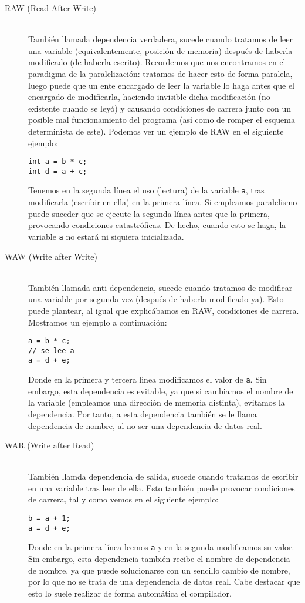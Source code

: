 \begin{description}
    \item [RAW (Read After Write)]~\\
        También llamada dependencia verdadera, sucede cuando tratamos de leer una variable (equivalentemente, posición de memoria) después de haberla modificado (de haberla escrito). Recordemos que nos encontramos en el paradigma de la paralelización: tratamos de hacer esto de forma paralela, luego puede que un ente encargado de leer la variable lo haga antes que el encargado de modificarla, haciendo invisible dicha modificación (no existente cuando se leyó) y causando condiciones de carrera junto con un posible mal funcionamiento del programa (así como de romper el esquema determinista de este). Podemos ver un ejemplo de RAW en el siguiente ejemplo:
    \begin{verbatim}
int a = b * c;
int d = a + c;
    \end{verbatim}
Tenemos en la segunda línea el uso (lectura) de la variable \verb|a|, tras modificarla (escribir en ella) en la primera línea. Si empleamos paralelismo puede suceder que se ejecute la segunda línea antes que la primera, provocando condiciones catastróficas. De hecho, cuando esto se haga, la variable \verb|a| no estará ni siquiera inicializada.

    \item [WAW (Write after Write)]~\\
        También llamada anti-dependencia, sucede cuando tratamos de modificar una variable por segunda vez (después de haberla modificado ya). Esto puede plantear, al igual que explicábamos en RAW, condiciones de carrera. Mostramos un ejemplo a continuación:
    \begin{verbatim}
a = b * c;
// se lee a
a = d + e;
    \end{verbatim}
Donde en la primera y tercera linea modificamos el valor de \verb|a|. Sin embargo, esta dependencia es evitable, ya que si cambiamos el nombre de la variable (empleamos una dirección de memoria distinta), evitamos la dependencia. Por tanto, a esta dependencia también se le llama dependencia de nombre, al no ser una dependencia de datos real.

    \item [WAR (Write after Read)]~\\
        También llamda dependencia de salida, sucede cuando tratamos de escribir en una variable tras leer de ella. Esto también puede provocar condiciones de carrera, tal y como vemos en el siguiente ejemplo:
    \begin{verbatim}
b = a + 1;
a = d + e;
    \end{verbatim}
Donde en la primera línea leemos \verb|a| y en la segunda modificamos su valor. Sin embargo, esta dependencia también recibe el nombre de dependencia de nombre, ya que puede solucionarse con un sencillo cambio de nombre, por lo que no se trata de una dependencia de datos real. Cabe destacar que esto lo suele realizar de forma automática el compilador.
\end{description}

